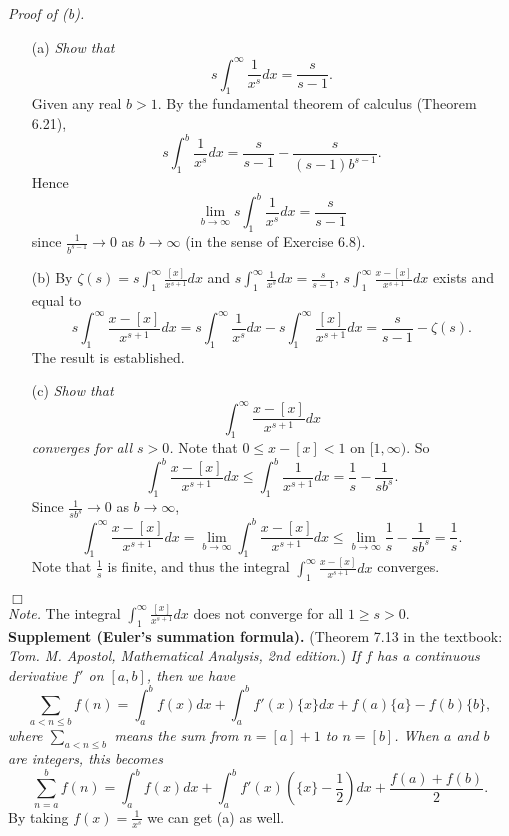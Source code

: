 \documentclass{article}
\begin{document}
\emph{Proof of (b).}
\begin{enumerate}
  \item[(a)]
  \emph{Show that}
  \[
    s \int_{1}^{\infty} \frac{1}{x^{s}} dx = \frac{s}{s-1}.
  \]
  Given any real $b > 1$. By the fundamental theorem of calculus (Theorem 6.21),
  \[
    s \int_{1}^{b} \frac{1}{x^{s}} dx
    = \frac{s}{s-1} - \frac{s}{(s-1)b^{s-1}}.
  \]
  Hence
  \[
    \lim_{b \to \infty} s \int_{1}^{b} \frac{1}{x^{s}} dx = \frac{s}{s-1}
  \]
  since $\frac{1}{b^{s-1}} \to 0$ as $b \to \infty$ (in the sense of Exercise 6.8).

  \item[(b)]
  By $\zeta(s) = s \int_{1}^{\infty} \frac{[x]}{x^{s+1}} dx$ and
  $s \int_{1}^{\infty} \frac{1}{x^{s}} dx = \frac{s}{s-1}$,
  $s \int_{1}^{\infty} \frac{x - [x]}{x^{s+1}} dx$ exists
  and equal to
  \[
    s \int_{1}^{\infty} \frac{x - [x]}{x^{s+1}} dx
    = s \int_{1}^{\infty} \frac{1}{x^{s}} dx - s \int_{1}^{\infty} \frac{[x]}{x^{s+1}} dx
    = \frac{s}{s-1} - \zeta(s).
  \]
  The result is established.

  \item[(c)]
  \emph{Show that
  \[
    \int_{1}^{\infty} \frac{x - [x]}{x^{s+1}} dx
  \]
  converges for all $s > 0$.}
  Note that $0 \leq x - [x] < 1$ on $[1,\infty)$.
  So
  \[
    \int_{1}^{b} \frac{x - [x]}{x^{s+1}} dx
    \leq
    \int_{1}^{b} \frac{1}{x^{s+1}} dx
    = \frac{1}{s} - \frac{1}{sb^s}.
  \]
  Since $\frac{1}{sb^{s}} \to 0$ as $b \to \infty$,
  \[
    \int_{1}^{\infty} \frac{x - [x]}{x^{s+1}} dx
    = \lim_{b \to \infty} \int_{1}^{b} \frac{x - [x]}{x^{s+1}} dx
    \leq \lim_{b \to \infty} \frac{1}{s} - \frac{1}{sb^s}
    = \frac{1}{s}.
  \]
  Note that $\frac{1}{s}$ is finite, and thus
  the integral $\int_{1}^{\infty} \frac{x - [x]}{x^{s+1}} dx$
  converges.
\end{enumerate}
$\Box$ \\



\emph{Note.}
The integral
$\int_{1}^{\infty} \frac{[x]}{x^{s+1}} dx$ does not converge for all $1 \geq s > 0$. \\



\textbf{Supplement (Euler's summation formula).}
(Theorem 7.13 in the textbook:
\emph{Tom. M. Apostol, Mathematical Analysis, 2nd edition.})
\emph{If $f$ has a continuous derivative $f'$ on $[a,b]$, then we have
\[
  \sum_{a < n \leq b} f(n)
  = \int_{a}^{b} f(x)dx
  + \int_{a}^{b} f'(x)\{x\}dx + f(a)\{a\} - f(b)\{b\},
\]
where $\sum_{a < n \leq b}$ means the sum from $n=[a]+1$ to $n=[b]$.
When $a$ and $b$ are integers, this becomes
\[
  \sum_{n=a}^{b} f(n)
  = \int_{a}^{b} f(x)dx
  + \int_{a}^{b} f'(x)\left( \{x\}-\frac{1}{2} \right)dx
  + \frac{f(a)+f(b)}{2}.
\]}
By taking $f(x) = \frac{1}{x^s}$ we can get (a) as well. \\\\
\end{document}
